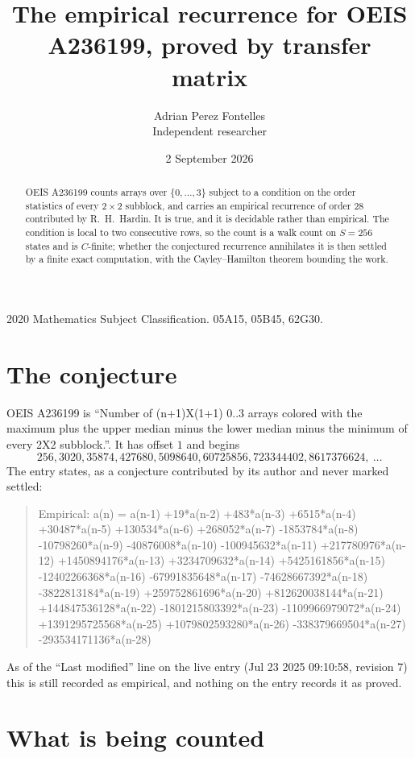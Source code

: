 \documentclass[11pt,a4paper]{article}
\title{The empirical recurrence for OEIS A236199, proved by transfer matrix}
\author{Adrian Perez Fontelles\\ \small Independent researcher}
\date{2 September 2026}
\theoremstyle{plain}
\theoremstyle{definition}
\begin{document}
\maketitle

\begin{abstract}
OEIS A236199 counts arrays over $\{0,\dots,3\}$ subject to a condition on the order
statistics of every $2\times2$ subblock, and carries an empirical recurrence of order
$28$ contributed by R.~H.~Hardin. It is true, and it is decidable rather than empirical.
The condition is local to two consecutive rows, so the count is a walk count on $S=256$
states and is $C$-finite; whether the conjectured recurrence annihilates it is then settled by
a finite exact computation, with the Cayley--Hamilton theorem bounding the work.
\end{abstract}

\noindent\small 2020 Mathematics Subject Classification. 05A15, 05B45, 62G30.\normalsize

\section{The conjecture}

OEIS A236199 is ``Number of (n+1)X(1+1) 0..3 arrays colored with the maximum plus the upper median minus the lower median minus the minimum of every 2X2 subblock.''. It has offset $1$ and begins
\[
256, 3020, 35874, 427680, 5098640, 60725856, 723344402, 8617376624,\ \dots
\]
The entry states, as a conjecture contributed by its author and never marked settled:
\begin{quote}
Empirical: a(n) = a(n-1) +19*a(n-2) +483*a(n-3) +6515*a(n-4) +30487*a(n-5) +130534*a(n-6) +268052*a(n-7) -1853784*a(n-8) -10798260*a(n-9) -40876008*a(n-10) -100945632*a(n-11) +217780976*a(n-12) +1450894176*a(n-13) +3234709632*a(n-14) +5425161856*a(n-15) -12402266368*a(n-16) -67991835648*a(n-17) -74628667392*a(n-18) -3822813184*a(n-19) +259752861696*a(n-20) +812620038144*a(n-21) +144847536128*a(n-22) -1801215803392*a(n-23) -1109966979072*a(n-24) +1391295725568*a(n-25) +1079802593280*a(n-26) -338379669504*a(n-27) -293534171136*a(n-28)
\end{quote}
As of the ``Last modified'' line on the live entry (Jul 23 2025 09:10:58, revision 7) this is still
recorded as empirical, and nothing on the entry records it as proved.

\section{What is being counted}
\end{document}
